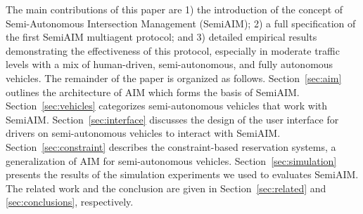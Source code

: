

The main contributions of this paper are 1) the introduction of the
concept of Semi-Autonomous Intersection Management (SemiAIM); 2) a
full specification of the first SemiAIM multiagent protocol; and 3)
detailed empirical results demonstrating the effectiveness of this
protocol, especially in moderate traffic levels with a mix of
human-driven, semi-autonomous, and fully autonomous vehicles.  The
remainder of the paper is organized as follows.  Section~\ref{sec:aim}
outlines the architecture of AIM which forms the basis of SemiAIM.
Section~\ref{sec:vehicles} categorizes semi-autonomous vehicles that
work with SemiAIM.  Section~\ref{sec:interface} discusses the design
of the user interface for drivers on semi-autonomous vehicles to
interact with SemiAIM.  Section~\ref{sec:constraint} describes the
constraint-based reservation systems, a generalization of AIM for
semi-autonomous vehicles.  Section~\ref{sec:simulation} presents the
results of the simulation experiments we used to evaluates SemiAIM.
The related work and the conclusion are given in
Section~\ref{sec:related} and \ref{sec:conclusions}, respectively.



